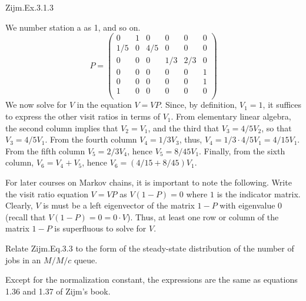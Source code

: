 \begin{exercise}
Zijm.Ex.3.1.3
\begin{solution}
We number  station a as 1, and so on.
\begin{equation*}
  P = 
  \begin{pmatrix}
     0 & 1 & 0 & 0 & 0 &0 \\
     1/5 & 0 & 4/5 & 0 & 0 & 0\\
     0& 0 & 0 & 1/3 & 2/3 & 0 \\
     0 & 0 & 0 & 0 & 0 & 1\\
     0 & 0 & 0 & 0 & 0 & 1\\
     1 & 0 & 0 & 0 & 0 & 0\\
  \end{pmatrix}
\end{equation*}
We now solve for $V$ in the equation $V = VP$. Since, by
definition, $V_1=1$, it suffices to express the other visit ratios in
terms of $V_1$. From elementary linear algebra, the second column
implies that $V_2 = V_1$, and the third that $V_3 = 4/5 V_2$, so that
$V_3 = 4/5 V_1$. From the fourth column $V_4 = 1/3 V_3$, thus,
$V_4 = 1/3 \cdot 4/5 V_1 = 4/15 V_1$.  From the fifth column
$V_5 = 2/3 V_4$, hence $V_5 = 8/45 V_1$. Finally, from the sixth
column, $V_6 = V_4+V_5$, hence $V_6 = (4/15 + 8/45)V_1$.

For later courses on Markov chains, it is important to note the
following. Write the visit ratio equation $V = VP$ as $V(1-P)=0$ where
$1$ is the indicator matrix. Clearly, $V$ is must be a left
eigenvector of the matrix $1-P$ with eigenvalue 0 (recall that
$V(1-P) = 0 = 0\cdot V$). Thus, at least one row or column of the matrix $1-P$ is superfluous to solve for $V$. 
\end{solution}
\end{exercise}

\begin{exercise}
  Relate Zijm.Eq.3.3 to the form of the steady-state distribution of
  the number of jobs in an $M/M/c$ queue.
  \begin{solution}
    Except for the normalization constant, the expressions are the
    same as equations 1.36 and 1.37 of Zijm's book.
  \end{solution}
\end{exercise}

